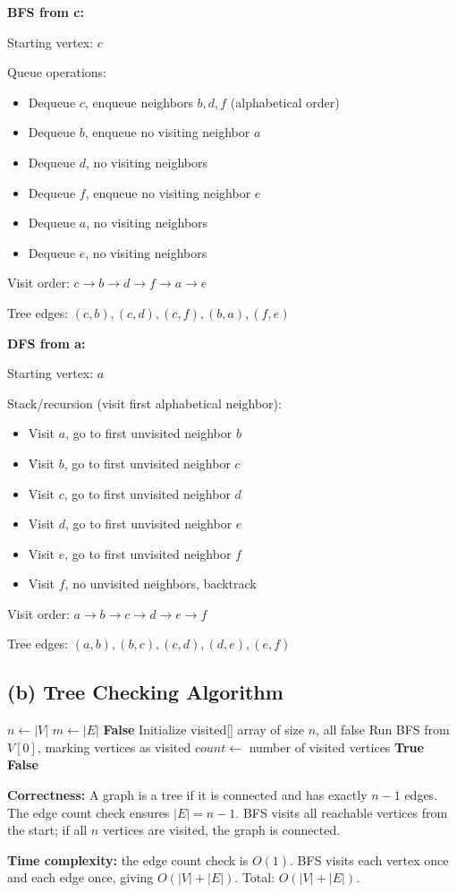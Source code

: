 \documentclass[11pt]{article}
\begin{document}
\textbf{BFS from c:}

Starting vertex: $c$

Queue operations:
\begin{itemize}
    \item Dequeue $c$, enqueue neighbors $b, d, f$ (alphabetical order)
    \item Dequeue $b$, enqueue no visiting neighbor $a$
    \item Dequeue $d$, no visiting neighbors
    \item Dequeue $f$, enqueue no visiting neighbor $e$
    \item Dequeue $a$, no visiting neighbors
    \item Dequeue $e$, no visiting neighbors
\end{itemize}

Visit order: $c \to b \to d \to f \to a \to e$

Tree edges: $(c,b), (c,d), (c,f), (b,a), (f,e)$

\textbf{DFS from a:}

Starting vertex: $a$

Stack/recursion (visit first alphabetical neighbor):
\begin{itemize}
    \item Visit $a$, go to first unvisited neighbor $b$
    \item Visit $b$, go to first unvisited neighbor $c$
    \item Visit $c$, go to first unvisited neighbor $d$
    \item Visit $d$, go to first unvisited neighbor $e$
    \item Visit $e$, go to first unvisited neighbor $f$
    \item Visit $f$, no unvisited neighbors, backtrack
\end{itemize}

Visit order: $a \to b \to c \to d \to e \to f$

Tree edges: $(a,b), (b,c), (c,d), (d,e), (e,f)$

\subsection*{(b) Tree Checking Algorithm}

\begin{algorithmic}[1]
    \State $n \gets |V|$
    \State $m \gets |E|$
        \State \Return \textbf{False}
    \EndIf
    \State Initialize visited[] array of size $n$, all false
    \State Run BFS from $V[0]$, marking vertices as visited
    \State $count \gets$ number of visited vertices
        \State \Return \textbf{True}
    \Else
        \State \Return \textbf{False}
    \EndIf
\EndProcedure
\end{algorithmic}

\textbf{Correctness:} A graph is a tree if it is connected and has exactly $n-1$ edges. The edge count check ensures $|E| = n-1$. BFS visits all reachable vertices from the start; if all $n$ vertices are visited, the graph is connected.

\textbf{Time complexity:} the edge count check is $O(1)$. BFS visits each vertex once and each edge once, giving $O(|V| + |E|)$. Total: $O(|V| + |E|)$.
\end{document}

